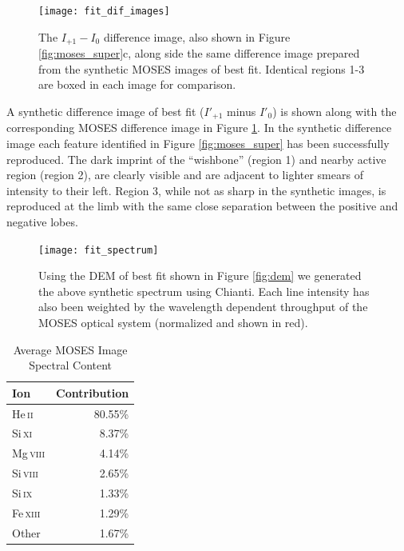 	
	\begin{figure}
		\centering
		\texttt{[image: fit\_dif\_images]}
		\caption{The $I_{+1}-I_0$ difference image, also shown in Figure \ref{fig:moses_super}c, along side the same difference image prepared from the synthetic MOSES images of best fit.  Identical regions 1-3 are boxed in each image for comparison.}
		\label{fig:dif_image_fit}
		
	\end{figure}
	
	A synthetic difference image of best fit ($I'_{+1}$ minus $I'_0$) is shown along with the corresponding MOSES difference image in Figure \ref{fig:dif_image_fit}.
	In the synthetic difference image each feature identified in Figure \ref{fig:moses_super} has been successfully reproduced.
	The dark imprint of the ``wishbone'' (region 1) and nearby active region (region 2), are clearly visible and are adjacent to lighter smears of intensity to their left.
	Region 3, while not as sharp in the synthetic images, is reproduced at the limb with the same close separation between the positive and negative lobes.
	
	\begin{figure}
		\centering
		\texttt{[image: fit\_spectrum]}
		\caption{Using the DEM of best fit shown in Figure \ref{fig:dem} we generated the above synthetic spectrum using Chianti. Each line intensity has also been weighted by the wavelength dependent throughput of the MOSES optical system (normalized and shown in red).}
		\label{fig:spectrum}
	\end{figure}
	\begin{table}
		\begin{center}
			\caption{Average MOSES Image Spectral Content}
			\label{table:spectral_content}
			\begin{tabular}{l|r}
				\hline
				Ion & Contribution \\
				\hline
				He\,\textsc{ii} & 80.55\% \\
				Si\,\textsc{xi} & 8.37\% \\
				Mg\,\textsc{viii} & 4.14\% \\
				Si\,\textsc{viii} & 2.65\% \\
				Si\,\textsc{ix} & 1.33\% \\
				Fe\,\textsc{xiii} & 1.29\% \\
				Other & 1.67\% \\ 
				\hline
			\end{tabular}
		\end{center}
	\end{table} 
	

